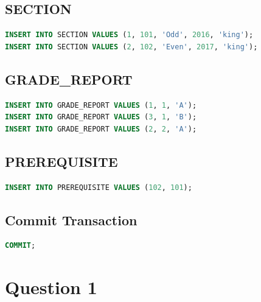 \documentclass[12pt,a4paper]{report}
\begin{document}
\subsection*{SECTION}
\begin{lstlisting}[language=SQL]
INSERT INTO SECTION VALUES (1, 101, 'Odd', 2016, 'king');
INSERT INTO SECTION VALUES (2, 102, 'Even', 2017, 'king');
\end{lstlisting}

\subsection*{GRADE\_REPORT}
\begin{lstlisting}[language=SQL]
INSERT INTO GRADE_REPORT VALUES (1, 1, 'A');
INSERT INTO GRADE_REPORT VALUES (3, 1, 'B');
INSERT INTO GRADE_REPORT VALUES (2, 2, 'A');
\end{lstlisting}

\subsection*{PREREQUISITE}
\begin{lstlisting}[language=SQL]
INSERT INTO PREREQUISITE VALUES (102, 101);
\end{lstlisting}

\subsection*{Commit Transaction}
\begin{lstlisting}[language=SQL]
COMMIT;
\end{lstlisting}

\newpage


\vspace{-1cm}

\section*{Question 1}
\end{document}
